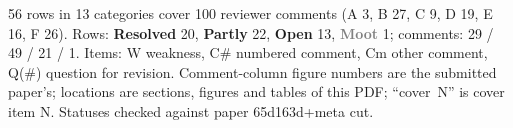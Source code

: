 \onecolumn
\pagestyle{empty}\thispagestyle{empty}
\newcommand{\stR}{\textcolor{green!45!black}{\textbf{Resolved}}}
\newcommand{\stP}{\textcolor{orange!85!black}{\textbf{Partly}}}
\newcommand{\stO}{\textcolor{red!75!black}{\textbf{Open}}}
\newcommand{\stM}{\textcolor{gray}{\textbf{Moot}}}
\setcounter{trkTable}{\value{table}}
\begingroup
\setlength{\parindent}{0pt}
\renewcommand{\theHtable}{trk.\arabic{table}}%
\noindent{}\par
\vspace{3pt}
{\footnotesize
56 rows in 13 categories cover 100 reviewer comments (A 3, B 27, C 9, D 19, E 16, F 26). Rows: \stR{} 20, \stP{} 22, \stO{} 13, \stM{} 1; comments: 29 / 49 / 21 / 1. Items: W weakness, C\# numbered comment, Cm other comment, Q(\#) question for revision. Comment-column figure numbers are the submitted paper's; locations are sections, figures and tables of this PDF; ``cover~N'' is cover item N. Statuses checked against paper 65d163d+meta cut.}\par\vspace{2pt}
\scriptsize
\setlength{\tabcolsep}{3pt}
\renewcommand{\arraystretch}{1.0}
\setlength{\LTpre}{0pt}\setlength{\LTpost}{0pt}
